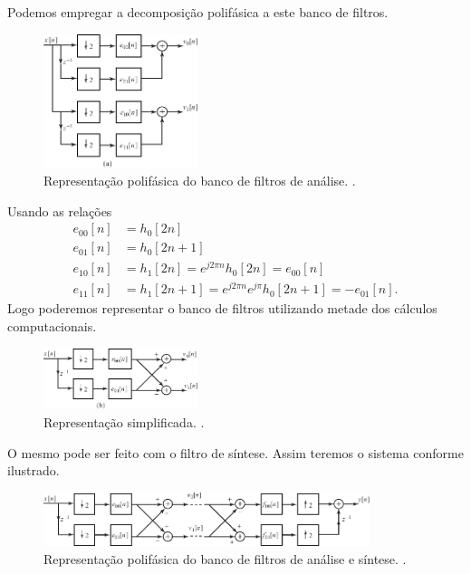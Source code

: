 \begin{frame}[allowframebreaks]
  Podemos empregar a decomposição polifásica a este banco de filtros. 
        \begin{figure}[h!]
        \centering
        \includegraphics[width=0.4\textwidth]{images/fig445a.pdf}
        \caption{Representação polifásica do banco de filtros de análise. \citep{oppenheim2009}.}
        \label{fig:fig445a}
        \end{figure}


  Usando as relações
  \begin{align}
  e_{00}[n] &= h_0[2n] \\
  e_{01}[n] &= h_0[2n+1] \\
  e_{10}[n] &= h_1[2n] = e^{j2\pi n} h_0[2n] = e_{00}[n] \\
  e_{11}[n] &= h_1[2n+1] = e^{j2\pi n} e^{j\pi} h_0[2n+1] = -e_{01}[n] .
  \end{align}
  Logo poderemos representar o banco de filtros utilizando metade dos cálculos computacionais.
        \begin{figure}[h!]
        \centering
        \includegraphics[width=0.4\textwidth]{images/fig445b.pdf}
        \caption{Representação simplificada. \citep{oppenheim2009}.}
        \label{fig:fig445b}
        \end{figure}


  O mesmo pode ser feito com o filtro de síntese. Assim teremos o sistema conforme ilustrado.
        \begin{figure}[h!]
        \centering
        \includegraphics[width=0.85\textwidth]{images/fig446.pdf}
        \caption{Representação polifásica do banco de filtros de análise e síntese. \citep{oppenheim2009}.}
        \label{fig:fig446}
        \end{figure}

\end{frame}


